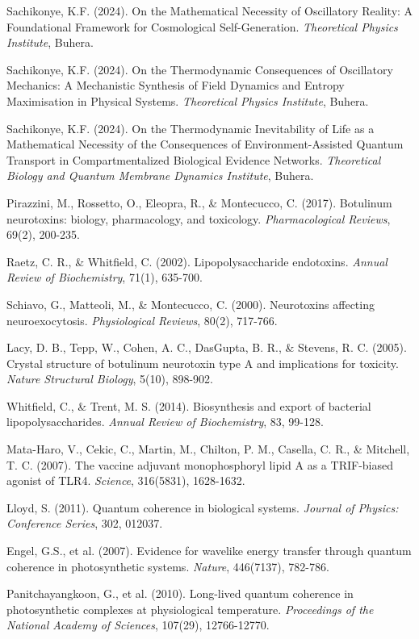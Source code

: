 \documentclass[12pt,a4paper]{article}
\begin{document}
\begin{thebibliography}{99}

Sachikonye, K.F. (2024). On the Mathematical Necessity of Oscillatory Reality: A Foundational Framework for Cosmological Self-Generation. \textit{Theoretical Physics Institute}, Buhera.

Sachikonye, K.F. (2024). On the Thermodynamic Consequences of Oscillatory Mechanics: A Mechanistic Synthesis of Field Dynamics and Entropy Maximisation in Physical Systems. \textit{Theoretical Physics Institute}, Buhera.

Sachikonye, K.F. (2024). On the Thermodynamic Inevitability of Life as a Mathematical Necessity of the Consequences of Environment-Assisted Quantum Transport in Compartmentalized Biological Evidence Networks. \textit{Theoretical Biology and Quantum Membrane Dynamics Institute}, Buhera.

Pirazzini, M., Rossetto, O., Eleopra, R., \& Montecucco, C. (2017). Botulinum neurotoxins: biology, pharmacology, and toxicology. \textit{Pharmacological Reviews}, 69(2), 200-235.

Raetz, C. R., \& Whitfield, C. (2002). Lipopolysaccharide endotoxins. \textit{Annual Review of Biochemistry}, 71(1), 635-700.

Schiavo, G., Matteoli, M., \& Montecucco, C. (2000). Neurotoxins affecting neuroexocytosis. \textit{Physiological Reviews}, 80(2), 717-766.

Lacy, D. B., Tepp, W., Cohen, A. C., DasGupta, B. R., \& Stevens, R. C. (2005). Crystal structure of botulinum neurotoxin type A and implications for toxicity. \textit{Nature Structural Biology}, 5(10), 898-902.

Whitfield, C., \& Trent, M. S. (2014). Biosynthesis and export of bacterial lipopolysaccharides. \textit{Annual Review of Biochemistry}, 83, 99-128.

Mata-Haro, V., Cekic, C., Martin, M., Chilton, P. M., Casella, C. R., \& Mitchell, T. C. (2007). The vaccine adjuvant monophosphoryl lipid A as a TRIF-biased agonist of TLR4. \textit{Science}, 316(5831), 1628-1632.

Lloyd, S. (2011). Quantum coherence in biological systems. \textit{Journal of Physics: Conference Series}, 302, 012037.

Engel, G.S., et al. (2007). Evidence for wavelike energy transfer through quantum coherence in photosynthetic systems. \textit{Nature}, 446(7137), 782-786.

Panitchayangkoon, G., et al. (2010). Long-lived quantum coherence in photosynthetic complexes at physiological temperature. \textit{Proceedings of the National Academy of Sciences}, 107(29), 12766-12770.

\end{thebibliography}
\end{document}
